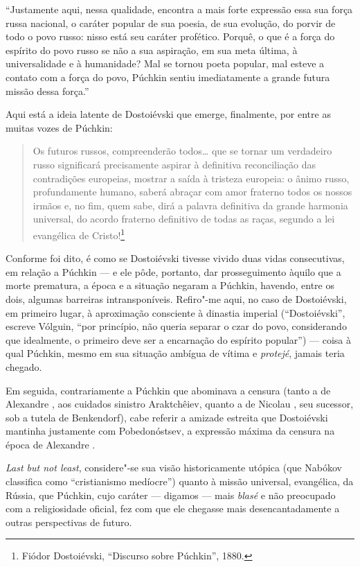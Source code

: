 ``Justamente aqui, nessa qualidade, encontra a mais forte expressão essa
sua força russa nacional, o caráter popular de sua poesia, de sua
evolução, do porvir de todo o povo russo: nisso está seu caráter
profético. Porquê, o que é a força do espírito do povo russo se não a
sua aspiração, em sua meta última, à universalidade e à humanidade? Mal
se tornou poeta popular, mal esteve a contato com a força do povo,
Púchkin sentiu imediatamente a grande futura missão dessa força.''

Aqui está a ideia latente de Dostoiévski que emerge, finalmente, por
entre as muitas vozes de Púchkin:

\begin{quote}
Os futuros russos, compreenderão todos\ldots{} que se tornar um verdadeiro
russo significará precisamente aspirar à definitiva reconciliação das
contradições europeias, mostrar a saída à tristeza europeia: o ânimo
russo, profundamente humano, saberá abraçar com amor fraterno todos os
nossos irmãos e, no fim, quem sabe, dirá a palavra definitiva da grande
harmonia universal, do acordo fraterno definitivo de todas as raças,
segundo a lei evangélica de Cristo!\footnote{Fiódor Dostoiévski,
``Discurso sobre Púchkin'', 1880.}
\end{quote}

Conforme foi dito, é como se Dostoiévski tivesse vivido duas vidas
consecutivas, em relação a Púchkin --- e ele pôde, portanto, dar
prosseguimento àquilo que a morte prematura, a época e a situação
negaram a Púchkin, havendo, entre os dois, algumas barreiras intransponíveis. Refiro"-me aqui, no caso
de Dostoiévski, em primeiro lugar, à aproximação consciente à dinastia
imperial (``Dostoiévski'', escreve Vólguin, ``por princípio, não
queria separar o czar do povo, considerando que idealmente, o primeiro
deve ser a encarnação do espírito popular'') --- coisa à qual Púchkin,
mesmo em sua situação ambígua de vítima e \emph{protejé}, jamais teria
chegado.

Em seguida, contrariamente a Púchkin que abominava a censura (tanto a
de Alexandre , aos cuidados sinistro Araktchêiev, quanto a de Nicolau 
, seu sucessor, sob a tutela de Benkendorf), cabe referir a amizade
estreita que Dostoiévski mantinha justamente com Pobedonóstsev, a
expressão máxima da censura na época de Alexandre .

\emph{Last but not least}, considere"-se sua visão historicamente utópica
(que Nabókov classifica como ``cristianismo medíocre'') quanto à
missão universal, evangélica, da Rússia, que Púchkin, cujo caráter --- digamos --- mais \emph{blasé} e não preocupado com a religiosidade
oficial, fez com que ele chegasse mais desencantadamente a outras
perspectivas de futuro.

